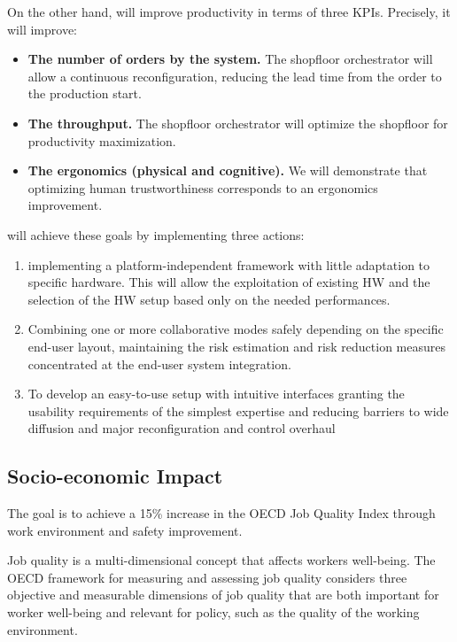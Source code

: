 On the other hand,  will improve productivity in terms
of three KPIs. Precisely, it will improve:

\begin{itemize}
\item
  \textbf{The number of orders by the system.} The shopfloor
  orchestrator will allow a continuous reconfiguration, reducing the
  lead time from the order to the production start.
\item
  \textbf{The throughput.} The shopfloor orchestrator will optimize the
  shopfloor for productivity maximization.
\item
  \textbf{The ergonomics (physical and cognitive).} We will demonstrate
  that optimizing human trustworthiness corresponds to an ergonomics
  improvement.
\end{itemize}

 will achieve these goals by implementing three
actions:

\begin{enumerate}
\def\labelenumi{\arabic{enumi}.}
\setcounter{enumi}{6}
\item
  implementing a platform-independent framework with little adaptation
  to specific hardware. This will allow the exploitation of existing HW
  and the selection of the HW setup based only on the needed
  performances.
\item
  Combining one or more collaborative modes safely depending on the
  specific end-user layout, maintaining the risk estimation and risk
  reduction measures concentrated at the end-user system integration.
\item
  To develop an easy-to-use setup with intuitive interfaces granting the
  usability requirements of the simplest expertise and reducing barriers
  to wide diffusion and major reconfiguration and control overhaul
\end{enumerate}

\subsection{Socio-economic Impact}\label{socio-economic-impact}

The goal is to achieve a 15\% increase in the OECD Job Quality Index
through work environment and safety improvement.

Job quality is a multi-dimensional concept that affects
workers\textquotesingle{} well-being. The OECD framework for measuring
and assessing job quality considers three objective and measurable
dimensions of job quality that are both important for worker well-being
and relevant for policy, such as the quality of the working environment.

